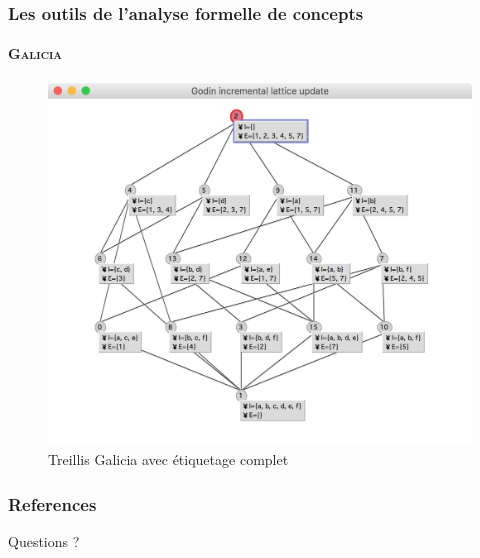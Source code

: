 \documentclass[french]{beamer}
\begin{document}
\begin{frame}
\frametitle{Les outils de l'analyse formelle de concepts}
\framesubtitle{\textsc{Galicia}}
\begin{figure}[H]
\begin{center}\includegraphics[scale=0.36]{figures/galicia-full-labeling.png}\end{center}
\caption{Treillis Galicia avec étiquetage complet}
\label{cap:fig:galicia-full-label}
\end{figure}
\end{frame}
\begin{frame}[allowframebreaks]
\frametitle{References}
\printbibliography
\end{frame}
\begin{frame}
\Huge{\centerline{Questions ?}}
\end{frame}
\end{document}
